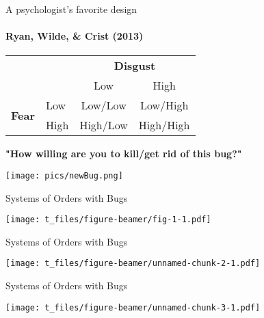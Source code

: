 \documentclass[ignorenonframetext,t]{beamer}
\begin{document}
\begin{frame}{A psychologist's favorite design}

\framesubtitle{Ryan, Wilde, \& Crist (2013)}

\vspace*{1cm}

\centering

\begin{tabular}{llcc}
\hline
& & \multicolumn{2}{c}{\bf{Disgust}} \\ \cline{2-4}
& & Low & High\\ \hline
\multirow{2}{*}{\bf{Fear}} & Low & Low/Low & Low/High \\
& High & High/Low & High/High    \\ \hline
\end{tabular}

\vspace*{.8cm}

\bf{"How willing are you to kill/get rid of this bug?"}

\vspace*{.4cm}

\centering \texttt{[image: pics/newBug.png]}

\end{frame}

\begin{frame}{Systems of Orders with Bugs}

\vspace*{.5cm}

\texttt{[image: t\_files/figure-beamer/fig-1-1.pdf]}

\end{frame}

\begin{frame}{Systems of Orders with Bugs}

\vspace*{.5cm}

\texttt{[image: t\_files/figure-beamer/unnamed-chunk-2-1.pdf]}

\end{frame}

\begin{frame}{Systems of Orders with Bugs}

\vspace*{.5cm}

\texttt{[image: t\_files/figure-beamer/unnamed-chunk-3-1.pdf]}

\end{frame}
\end{document}
